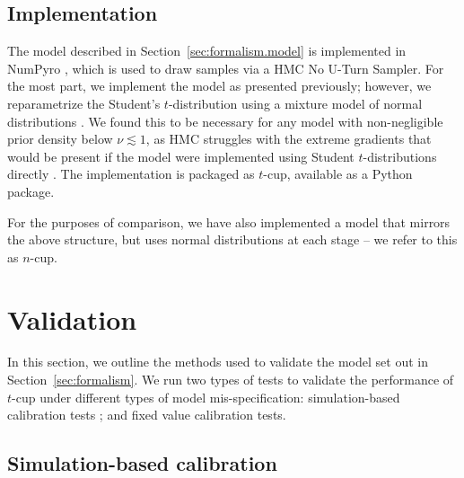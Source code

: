 \documentclass[fleqn,usenatbib]{rasti}
\begin{document}
\subsection{Implementation}
\label{sec:formalism.implementation}

The model described in Section~\ref{sec:formalism.model} is implemented in
NumPyro \citep{NumPyro, Pyro}, which is used to draw samples via a HMC No U-Turn
Sampler. For the most part, we implement the model as presented previously;
however, we reparametrize the Student's $t$-distribution using a mixture model
of normal distributions \citep[e.g.][]{Stan}. We found this to be necessary for
any model with non-negligible prior density below $\nu \lesssim 1$, as HMC
struggles with the extreme gradients that would be present if the model were
implemented using Student $t$-distributions directly \citep{Neal:2003,
Betancourt:2013}.  The implementation is packaged as $t$-cup, available as a
Python package\footnotemark.

For the purposes of comparison, we have also implemented a model that mirrors
the above structure, but uses normal distributions at each stage -- we refer to
this as $n$-cup.


\section{Validation}
\label{sec:methods}

In this section, we outline the methods used to validate the model set out in
Section~\ref{sec:formalism}. We run two types of tests to validate the
performance of $t$-cup under different types of model mis-specification:
simulation-based calibration tests \citep{Cook:2006, Talts:2018}; and fixed
value calibration tests.

\subsection{Simulation-based calibration}
\label{sec:methods.sbc}
\end{document}
